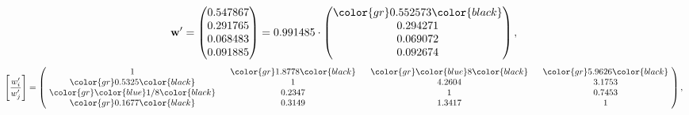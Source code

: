 \begin{example}
\begin{equation*}
\mathbf{w}^{\prime} =
\begin{pmatrix}
0.547867\\
0.291765\\
0.068483\\
0.091885
\end{pmatrix} =
0.991485\cdot
\begin{pmatrix}
\color{gr} 0.552573\color{black} \\
0.294271\\
0.069072\\
0.092674
\end{pmatrix},
\end{equation*}
\begin{equation*}
\left[ \frac{{w}^{\prime}_i}{{w}^{\prime}_j} \right] =
\begin{pmatrix}
$\,\,$ 1 $\,\,$ & $\,\,$\color{gr} 1.8778\color{black} $\,\,$ & $\,\,$\color{gr} \color{blue} 8\color{black} $\,\,$ & $\,\,$\color{gr} 5.9626\color{black} $\,\,$ \\
$\,\,$\color{gr} 0.5325\color{black} $\,\,$ & $\,\,$ 1 $\,\,$ & $\,\,$4.2604$\,\,$ & $\,\,$3.1753  $\,\,$ \\
$\,\,$\color{gr} \color{blue}  1/8\color{black} $\,\,$ & $\,\,$0.2347$\,\,$ & $\,\,$ 1 $\,\,$ & $\,\,$0.7453 $\,\,$ \\
$\,\,$\color{gr} 0.1677\color{black} $\,\,$ & $\,\,$0.3149$\,\,$ & $\,\,$1.3417$\,\,$ & $\,\,$ 1  $\,\,$ \\
\end{pmatrix},
\end{equation*}
\end{example}
\newpage
